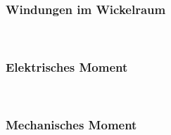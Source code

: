 \subsubsection{Windungen im Wickelraum}
\begin{minipage}{0.45\textwidth} 
 \\
\end{minipage} 
\begin{minipage}{0.45\textwidth} 
 
\end{minipage}

\subsubsection{Elektrisches Moment} 
\begin{minipage}{0.45\textwidth} 
 \\
\end{minipage} 
\begin{minipage}{0.45\textwidth} 
 
\end{minipage}

\subsubsection{Mechanisches Moment} 
\begin{minipage}{0.45\textwidth} 
 \\
\end{minipage} 
\begin{minipage}{0.45\textwidth} 
\end{minipage}

